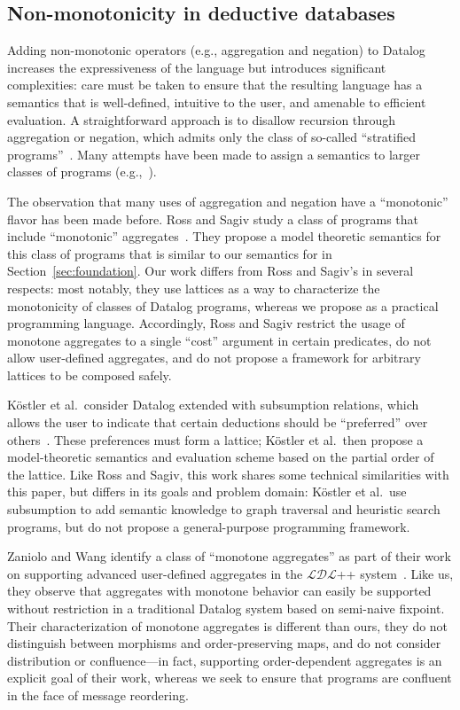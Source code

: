 

\subsection{Non-monotonicity in deductive databases}
Adding non-monotonic operators (e.g., aggregation and negation) to Datalog
increases the expressiveness of the language but introduces significant
complexities: care must be taken to ensure that the resulting language has a
semantics that is well-defined, intuitive to the user, and amenable to efficient
evaluation. A straightforward approach is to disallow recursion through
aggregation or negation, which admits only the class of so-called ``stratified
programs''~\cite{Apt1988}. Many attempts have been made to assign a semantics to
larger classes of programs (e.g.,~\cite{Gelfond1988,Ross1990,VanGelder1991}).

The observation that many uses of aggregation and negation have a ``monotonic''
flavor has been made before. Ross and Sagiv study a class of programs that
include ``monotonic'' aggregates~\cite{Ross1992}. They propose a model theoretic
semantics for this class of programs that is similar to our semantics for
\baselang in Section~\ref{sec:foundation}. Our work differs from Ross and
Sagiv's in several respects: most notably, they use lattices as a way to
characterize the monotonicity of classes of Datalog programs, whereas we propose
\lang as a practical programming language. Accordingly, Ross and Sagiv restrict
the usage of monotone aggregates to a single ``cost'' argument in certain
predicates, do not allow user-defined aggregates, and do not propose a framework
for arbitrary lattices to be composed safely.

K\"{o}stler et al.\ consider Datalog extended with subsumption relations, which
allows the user to indicate that certain deductions should be ``preferred'' over
others~\cite{Kostler1995}. These preferences must form a lattice; K\"{o}stler et
al.\ then propose a model-theoretic semantics and evaluation scheme based on the
partial order of the lattice. Like Ross and Sagiv, this work shares some
technical similarities with this paper, but differs in its goals and problem
domain: K\"{o}stler et al.\ use subsumption to add semantic knowledge to graph
traversal and heuristic search programs, but do not propose a general-purpose
programming framework.

Zaniolo and Wang identify a class of ``monotone aggregates'' as part of their
work on supporting advanced user-defined aggregates in the $\mathcal{LDL}$++
system~\cite{Zaniolo1999}. Like us, they observe that aggregates with monotone
behavior can easily be supported without restriction in a traditional Datalog
system based on semi-naive fixpoint. Their characterization of monotone
aggregates is different than ours, they do not distinguish between morphisms and
order-preserving maps, and do not consider distribution or confluence---in fact,
supporting order-dependent aggregates is an explicit goal of their work, whereas
we seek to ensure that programs are confluent in the face of message reordering.
